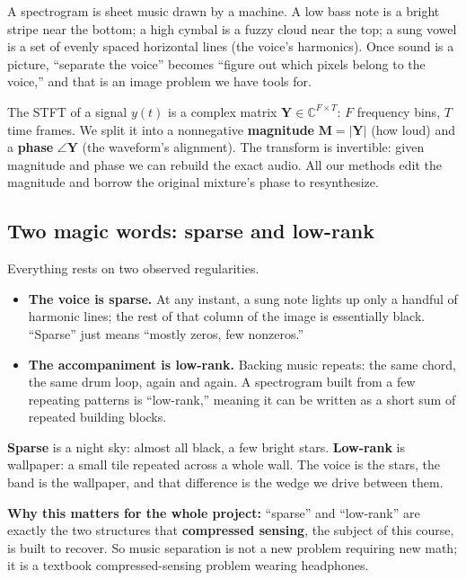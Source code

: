 \documentclass[11pt]{article}
\begin{document}
\begin{analogy}
A spectrogram is sheet music drawn by a machine. A low bass note is a bright stripe
near the bottom; a high cymbal is a fuzzy cloud near the top; a sung vowel is a set
of evenly spaced horizontal lines (the voice's harmonics). Once sound is a picture,
``separate the voice'' becomes ``figure out which pixels belong to the voice,''
and that is an image problem we have tools for.
\end{analogy}

\begin{slowmath}
The STFT of a signal $y(t)$ is a complex matrix $\bm Y\in\mathbb C^{F\times T}$:
$F$ frequency bins, $T$ time frames. We split it into a nonnegative
\textbf{magnitude} $\bm M=\lvert\bm Y\rvert$ (how loud) and a \textbf{phase}
$\angle\bm Y$ (the waveform's alignment). The transform is invertible: given
magnitude and phase we can rebuild the exact audio. All our methods edit the
magnitude and borrow the original mixture's phase to resynthesize.
\end{slowmath}

\subsection{Two magic words: sparse and low-rank}
Everything rests on two observed regularities.

\begin{itemize}
\item \textbf{The voice is sparse.} At any instant, a sung note lights up only a
handful of harmonic lines; the rest of that column of the image is essentially
black. ``Sparse'' just means ``mostly zeros, few nonzeros.''
\item \textbf{The accompaniment is low-rank.} Backing music repeats: the same
chord, the same drum loop, again and again. A spectrogram built from a few
repeating patterns is ``low-rank,'' meaning it can be written as a short sum of
repeated building blocks.
\end{itemize}

\begin{analogy}
\textbf{Sparse} is a night sky: almost all black, a few bright stars. \textbf{Low-rank}
is wallpaper: a small tile repeated across a whole wall. The voice is the stars,
the band is the wallpaper, and that difference is the wedge we drive between them.
\end{analogy}

\begin{keypoint}
\textbf{Why this matters for the whole project:} ``sparse'' and ``low-rank'' are
exactly the two structures that \textbf{compressed sensing}, the subject of this
course, is built to recover. So music separation is not a new problem requiring new
math; it is a textbook compressed-sensing problem wearing headphones.
\end{keypoint}
\end{document}

